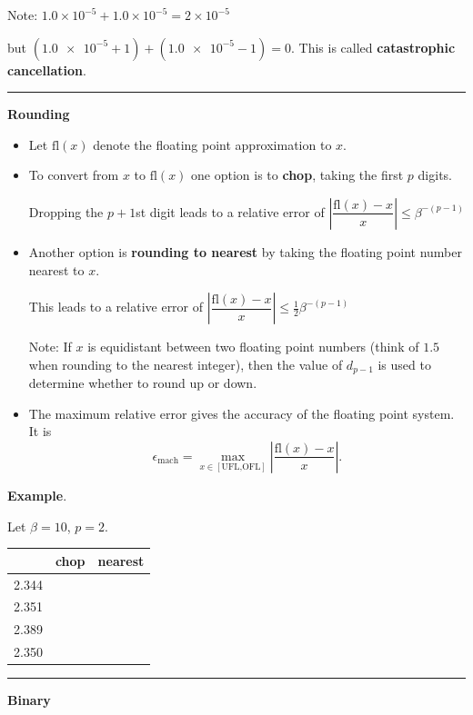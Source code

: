 \documentclass[12pt,letterpaper,noanswers]{exam}
\begin{document}
Note: $1.0\times 10^{-5} + 1.0\times 10^{-5} = 2\times 10^{-5}$ 

but $(\num{1.0e-5} + 1) + (\num{1.0e-5}-1) = 0$.  This is called \textbf{catastrophic cancellation}.

\vspace{0.2cm}
\hrule
\vspace{0.2cm}

\noindent\textbf{Rounding}
\begin{tcolorbox}
\begin{itemize}
\itemsep0pt
    \item Let $\text{fl}(x)$ denote the floating point approximation to $x$.
    \item To convert from $x$ to $\text{fl}(x)$ one option is to \textbf{chop}, taking the first $p$ digits.  
    
    Dropping the $p+1$st digit leads to a relative error of $\left\vert\dfrac{\text{fl}(x) - x}{x}\right\vert\leq \beta^{-(p-1)}$
    \item Another option is \textbf{rounding to nearest} by taking the floating point number nearest to $x$.  
    
    This leads to a relative error of $\left\vert\dfrac{\text{fl}(x) - x}{x}\right\vert\leq \frac{1}{2}\beta^{-(p-1)}$
    
    Note: If $x$ is equidistant between two floating point numbers (think of $1.5$ when rounding to the nearest integer), then the value of $d_{p-1}$ is used to determine whether to round up or down.  
    \item The maximum relative error gives the accuracy of the floating point system.  It is \[\epsilon_{\text{mach}} = \max\limits_{x\in[\text{UFL,OFL}]} \left\vert\dfrac{\text{fl}(x) - x}{x}\right\vert.\]
\end{itemize}
\end{tcolorbox}

\noindent\textbf{Example}.

Let $\beta = 10$, $p =2$.

\begin{tabular}{c|c|c}
     & chop & nearest \\
     \hline
  2.344   & & \\
2.351 & & \\
2.389 & & \\
2.350 & & \\
\end{tabular}


\vspace{0.2cm}
\hrule
\vspace{0.2cm}
\noindent\textbf{Binary}
\end{document}

